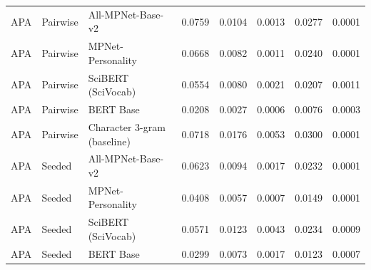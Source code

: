 \begin{table}[ht]
\begin{tabular}{lllrrrrr}
APA & Pairwise & All-MPNet-Base-v2 & 0.0759 & 0.0104 & 0.0013 & 0.0277 & 0.0001 \\
APA & Pairwise & MPNet-Personality & 0.0668 & 0.0082 & 0.0011 & 0.0240 & 0.0001 \\
APA & Pairwise & SciBERT (SciVocab) & 0.0554 & 0.0080 & 0.0021 & 0.0207 & 0.0011 \\
APA & Pairwise & BERT Base & 0.0208 & 0.0027 & 0.0006 & 0.0076 & 0.0003 \\
APA & Pairwise & Character 3-gram (baseline) & 0.0718 & 0.0176 & 0.0053 & 0.0300 & 0.0001 \\
APA & Seeded & All-MPNet-Base-v2 & 0.0623 & 0.0094 & 0.0017 & 0.0232 & 0.0001 \\
APA & Seeded & MPNet-Personality & 0.0408 & 0.0057 & 0.0007 & 0.0149 & 0.0001 \\
APA & Seeded & SciBERT (SciVocab) & 0.0571 & 0.0123 & 0.0043 & 0.0234 & 0.0009 \\
APA & Seeded & BERT Base & 0.0299 & 0.0073 & 0.0017 & 0.0123 & 0.0007 \\
\bottomrule
\end{tabular}
\end{table}
